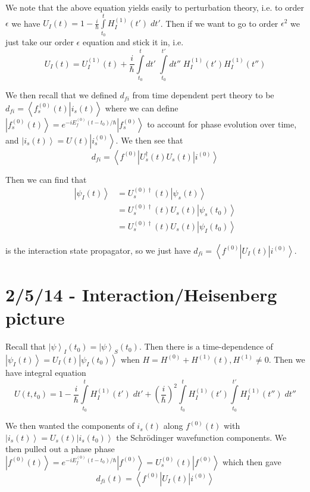 \documentclass[10pt]{report}
\newcommand{\bra}[1]{\left<#1\right|}
\newcommand{\ket}[1]{\left|#1\right>}
\newcommand{\dotp}[2]{\left<#1\left.\right|#2\right>}
\begin{document}
We note that the above equation yields easily to perturbation theory, i.e. to order $\epsilon$ we have $U_I(t) = 1 - \frac{i}{\hbar}\displaystyle\int\limits_{t_0}^{t}H_I^{(1)}(t')\;dt'$. Then if we want to go to order $\epsilon^2$ we just take our order $\epsilon$ equation and stick it in, i.e.
\begin{equation}
    U_I(t) = U^{(1)}_I(t) + \frac{i}{\hbar}\displaystyle\int\limits_{t_0}^{t}dt'\;\displaystyle\int\limits_{t_0}^{t'}dt''\;H_I^{(1)}(t')H_I^{(1)}(t'')
    \label{2.3.2order}
\end{equation}

We then recall that we defined $d_{fi}$ from time dependent pert theory to be $d_{fi} = \dotp{f_s^{(0)}(t)}{i_s(t)}$ where we can define $\ket{f_s^{(0)}(t)} = e^{-iE_f^{(0)}(t-t_0)/\hbar}\ket{f_s^{(0)}}$ to account for phase evolution over time, and $\ket{i_s(t)} = U(t) \ket{i^{(0)}_s}$. We then see that
$$d_{fi} = \bra{f^{(0)}}U_s^\dagger(t) U_s(t)\ket{i^{(0)}}$$

Then we can find that
\begin{align}
    \ket{\psi_I(t)} &= U_s^{(0)\dagger}(t)\ket{\psi_s(t)}\\
    &= U_s^{(0)\dagger}(t) U_s(t)\ket{\psi_s(t_0)}\\
    &= U_s^{(0)\dagger}(t)U_s(t)\ket{\psi_I(t_0)}
\end{align}

is the interaction state propagator, so we just have $d_{fi} = \bra{f^{(0)}}U_I(t)\ket{i^{(0)}}$. 

\chapter{2/5/14 - Interaction/Heisenberg picture}

Recall that $\ket{\psi}_I(t_0) = \ket{\psi}_S(t_0)$. Then there is a time-dependence of $\ket{\psi_I(t)} = U_I(t)\ket{\psi_I(t_0)}$ when $H = H^{(0)} + H^{(1)}(t), H^{(1)} \neq 0$. Then we have integral equation
\begin{equation}
    U(t,t_0) = 1 - \frac{i}{\hbar} \displaystyle\int\limits_{t_0}^{t}H^{(1)}_I(t')\; dt' + \left( \frac{i}{\hbar} \right)^2\displaystyle\int\limits_{t_0}^{t}H_I^{(1)}(t') \displaystyle\int\limits_{t_0}^{t'}H_I^{(1)}(t'')\;dt''
    \label{2.5.nextOrd}
\end{equation}

We then wanted the components of $i_s(t)$ along $f^{(0)}(t)$ with $\ket{i_s(t)} = U_s(t)\ket{i_s(t_0)}$ the Schr\"odinger wavefunction components. We then pulled out a phase phase $\ket{f^{(0)}(t)} = e^{-iE_f^{(0)}(t-t_0)/\hbar}\ket{f^{(0)}} = U_s^{(0)}(t)\ket{f^{(0)}}$ which then gave
\begin{equation}
    d_{fi}(t) = \bra{f^{(0)}}U_I(t)\ket{i^{(0)}}
    \label{2.5.components}
\end{equation}
\end{document}
